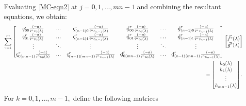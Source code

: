 \documentclass[10pt,reqno,oneside,a4paper]{article}
\begin{document}
Evaluating \eqref{MC-eqn2} at $j = 0, 1, \ldots, mn-1$ and combining the resultant equations, we obtain:
\begin{equation}\label{MC-eqn3}
\begin{aligned}
\sum^{m}_{r=1} \begin{bmatrix} \textup{\c{c}}_{0 0}^r  \frac{(-a)}{i^n c_0(\lambda)} & \ldots & \textup{\c{c}}_{(n-1) 0}^r  \frac{(-a)}{i^n c_{n-1}(\lambda)}  & \textup{\c{d}}_{0 0}^r  \frac{(-a)}{i^n c_0(\lambda)} & \ldots & \textup{\c{d}}_{(n-1) 0}^r  \frac{(-a)}{i^n c_{n-1}(\lambda)} \\
\textup{\c{c}}_{0 1}^r  \frac{(-a)}{i^n c_0(\lambda)} & \ldots & \textup{\c{c}}_{(n-1) 1}^r  \frac{(-a)}{i^n c_{n-1}(\lambda)}  & \textup{\c{d}}_{01}^r  \frac{(-a)}{i^n c_0(\lambda)} & \ldots & \textup{\c{d}}_{(n-1)1}^r  \frac{(-a)}{i^n c_{n-1}(\lambda)}  \\
\vdots & \ddots &\vdots & \vdots & \ddots & \vdots \\
\textup{\c{c}}_{0 (mn-1)}^r  \frac{(-a)}{i^n c_0(\lambda)} & \ldots & \textup{\c{c}}_{(n-1) (mn-1)}^r  \frac{(-a)}{i^n c_{n-1}(\lambda)}  & \textup{\c{d}}_{0 (mn-1) }^r  \frac{(-a)}{i^n c_0(\lambda)} & \ldots & \textup{\c{d}}_{(n-1)(mn-1)}^r  \frac{(-a)}{i^n c_{n-1}(\lambda)} 
\end{bmatrix} 
\begin{bmatrix}  \vec{f^r}(\lambda) \\ \vec{g^r}(\lambda) \end{bmatrix} \\
=
\begin{bmatrix} 
h_0(\lambda) \\ h_1(\lambda) \\ \vdots \\ h_{mn-1}(\lambda)
\end{bmatrix}.&
\end{aligned}
\end{equation}
For $k = 0, 1, \ldots, m-1,$ define the following matrices 
\end{document}
